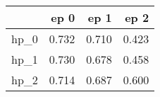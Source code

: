 \begin{tabular}{lrrr}
\toprule
{} &   ep 0 &   ep 1 &   ep 2 \\
\midrule
hp\_0 &  0.732 &  0.710 &  0.423 \\
hp\_1 &  0.730 &  0.678 &  0.458 \\
hp\_2 &  0.714 &  0.687 &  0.600 \\
\bottomrule
\end{tabular}
